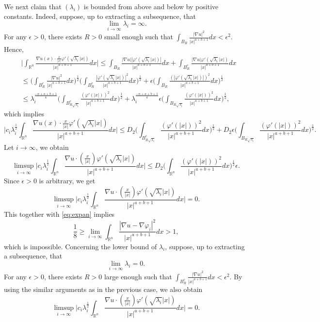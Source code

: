\documentclass[a4paper,12pt]{article}
\theoremstyle{plain}
\theoremstyle{definition}
\theoremstyle{remark}
\def\R{\mathbb R}%
\def\lam{\lambda}%
\def\ep{\epsilon}%
\def\na{\nabla}%
\def\irn{\int_{\R^n}}
\numberwithin{equation}{section}
\begin{document}
We next claim that $(\lam_i)$ is bounded from above and below by positive constants. Indeed, suppose, up to extracting a subsequence, that
$$\lim_{i\to \infty} \lam_i = \infty.$$
For any $\epsilon >0$, there exists $R>0$ small enough such that $\int_{B_R}\frac{ |\na u|^2}{|x|^{a+b+1}} dx < \ep^2$. Hence, 
\begin{align*}
	&\Big| \irn \frac{\na u(x) \cdot \frac{x}{|x|} \varphi'(\sqrt{\lambda_i}|x|)}{|x|^{a+b+1}}dx\Big|\leq \int_{B_R} \frac{|\na u||\varphi'(\sqrt{\lambda_i}|x|)|}{|x|^{a+b+1}} dx + \int_{B_R^c}\frac{ |\na u| \varphi'(\sqrt{\lambda_i}|x|)}{|x|^{a+b+1}}dx\\
	&\leq \Big(\int_{B_R^c} \frac{|\na u|^2}{|x|^{a+b+1}} dx\Big)^{\frac12} \Big(\int_{B_R^c}\frac{|\varphi'(\sqrt{\lambda_i}|x|)|^2}{|x|^{a+b+1}}dx\Big)^{\frac12} + \ep \Big(\int_{B_R}\frac{(|\varphi'(\sqrt{\lambda_i}|x|)|)^2}{|x|^{a+b+1}} dx\Big)^{\frac12}\\
	&\leq \lam_i^{\frac {-n+a+b+1}{4}}\Big(\int_{B_{R\sqrt{\lam_i}}^c}\frac{(\varphi'(|x|))^2}{|x|^{a+b+1}}dx\Big)^{\frac12} + \lam_i^{\frac {-n+a+b+1}{4}} \ep  \Big(\int_{B_{R\sqrt{\lam_i}}}\frac{(\varphi'(|x|))^2}{|x|^{a+b+1}} dx\Big)^{\frac12},
\end{align*}
which implies
$$
\Big|c_i \lam_i^{\frac 12}\irn \frac{\na u(x) \cdot \frac{x}{|x|} \varphi'(\sqrt{\lambda_i}|x|)}{|x|^{a+b+1}}dx\Big| \leq D_2 \Big(\int_{B_{R\sqrt{\lam_i}}^c}\frac{(\varphi'(|x|))^2}{|x|^{a+b+1}} dx\Big)^{\frac12} + D_2\ep  \Big(\int_{B_{R\sqrt{\lam_i}}}\frac{(\varphi'(|x|))^2}{|x|^{a+b+1}} dx\Big)^{\frac12}.
$$
Let $i\to \infty$, we obtain
$$\limsup_{i\to \infty}\Big|c_i \lam_i^{\frac 12}\irn \frac{\na u \cdot (\frac{x}{|x|}) \varphi'(\sqrt{\lambda_i}|x|)}{|x|^{a+b+1}}dx\Big| \leq D_2 \Big(\irn \frac{(\varphi'(|x|))^2}{|x|^{a+b+1}}  dx\Big)^{\frac12} \ep.$$
Since $\ep>0$ is arbitrary, we get
$$\limsup_{i\to \infty}\Big|c_i \lam_i^{\frac 12}\irn \frac{\na u \cdot (\frac{x}{|x|}) \varphi'(\sqrt{\lambda_i}|x|)}{|x|^{a+b+1}} dx \Big|=0.$$
This together with \eqref{eq:expan} implies
$$\frac18 \geq \lim_{i\to \infty} \irn \frac{|\na u -\na \varphi_i|^2}{|x|^{a+b+1}} dx > 1,$$
which is impossible.{ Concerning the lower bound of $\lambda_i$,}  suppose, up to extracting a subsequence, that
$$\lim_{i\to \infty} \lam_i = 0.$$
For any $\epsilon >0$, there exists $R>0$ large enough such that $\int_{B_R^c}\frac{ |\na u|^2 }{|x|^{a+b+1}}dx < \ep^2$. By using the similar arguments as in the previous case, we also obtain
$$\limsup_{i\to \infty}\Big|c_i \lam_i^{\frac 12}\irn \frac{\na u \cdot (\frac{x}{|x|}) \varphi'(\sqrt{\lambda_i}|x|)}{|x|^{a+b+1}} dx \Big|=0.$$
\end{document}
